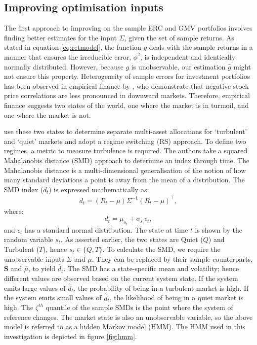 \documentclass[
]{article}
\begin{document}
\hypertarget{improving-optimisation-inputs}{%
\subsection{Improving optimisation inputs}\label{improving-optimisation-inputs}}

The first approach to improving on the sample ERC and GMV portfolios involves finding better estimates
for the input \(\Sigma\), given the set of sample returns. As stated in equation \eqref{eq:retmodel},
the function \(g\) deals with the sample returns in a manner that ensures the irreducible error,
\(\phi^2\), is independent and identically normally distributed. However, because \(g\) is unobservable,
our estimation \(\hat{g}\) might not ensure this property. Heterogeneity of sample errors for investment
portfolios has been observed in empirical finance by \citet{AC02}, who demonstrate that negative stock
price correlations are less pronounced in downward markets. Therefore, empirical finance suggests two
states of the world, one where the market is in turmoil, and one where the market is not.

\citet{K12} use these two states to determine separate multi-asset allocations for `turbulent' and `quiet'
markets and adopt a regime switching (RS) approach. To define two regimes, a metric to measure
turbulence is required. The authors take a squared Mahalanobis distance (SMD) approach to determine an
index through time. The Mahalanobis distance is a multi-dimensional generalisation of the notion of how
many standard deviations a point is away from the mean of a distribution. The SMD index (\(d_t\)) is
expressed mathematically as:
\begin{align}
d_t = (R_t - \mu)\Sigma^{-1}(R_t - \mu)^\intercal,
\end{align}
where: \[d_t = \mu_{s_t} + \sigma_{s_t}\epsilon_t,\] and \(\epsilon_t\) has a standard normal
distribution. The state at time \(t\) is shown by the random variable \(s_t\). As asserted earlier, the two
states are Quiet (\(Q\)) and Turbulent (\(T\)), hence \(s_t \in \{Q, T\}\). To calculate the SMD, we require
the unobservable inputs \(\Sigma\) and \(\mu\). They can be replaced by their sample counterparts,
\(\textbf{S}\) and \(\hat{\mu}\), to yield \(\hat{d}_t\). The SMD has a state-specific mean and volatility;
hence different values are observed based on the current system state. If the system emits large values
of \(\hat{d}_t\), the probability of being in a turbulent market is high. If the system emits small
values of \(\hat{d}_t\), the likelihood of being in a quiet market is high. The \(\zeta^{th}\) quantile of
the sample SMDs is the point where the system of reference changes. The market state is also an
unobservable variable, so the above model is referred to as a hidden Markov model (HMM). The HMM used
in this investigation is depicted in figure \ref{fig:hmm}.
\end{document}
